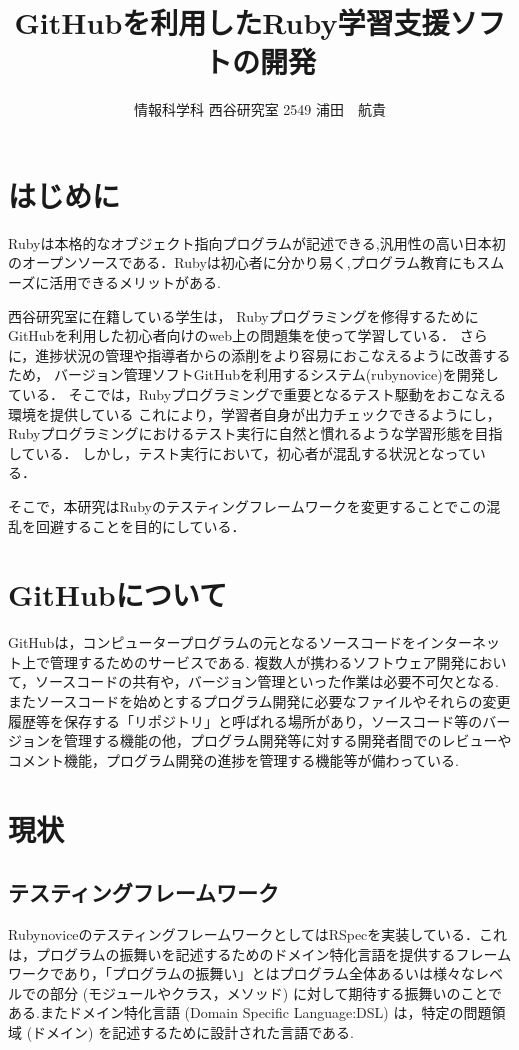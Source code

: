 \documentclass[a4j,twocolumn,uplatex]{jsarticle}
\begin{document}
\title{GitHubを利用したRuby学習支援ソフトの開発}
\author{情報科学科 西谷研究室 2549 浦田　航貴}
\date{}
\maketitle
\section{はじめに}
Rubyは本格的なオブジェクト指向プログラムが記述できる,汎用性の高い日本初のオープンソースである．Rubyは初心者に分かり易く,プログラム教育にもスムーズに活用できるメリットがある.


西谷研究室に在籍している学生は，
Rubyプログラミングを修得するためにGitHubを利用した初心者向けのweb上の問題集を使って学習している．
さらに，進捗状況の管理や指導者からの添削をより容易におこなえるように改善するため，
バージョン管理ソフトGitHubを利用するシステム(rubynovice)を開発している．
そこでは，Rubyプログラミングで重要となるテスト駆動をおこなえる環境を提供している
これにより，学習者自身が出力チェックできるようにし，
Rubyプログラミングにおけるテスト実行に自然と慣れるような学習形態を目指している．
しかし，テスト実行において，初心者が混乱する状況となっている．

そこで，本研究はRubyのテスティングフレームワークを変更することでこの混乱を回避することを目的にしている．

\section{GitHubについて}
GitHubは，コンピュータープログラムの元となるソースコードをインターネット上で管理するためのサービスである.
複数人が携わるソフトウェア開発において，ソースコードの共有や，バージョン管理といった作業は必要不可欠となる.
またソースコードを始めとするプログラム開発に必要なファイルやそれらの変更履歴等を保存する「リポジトリ」と呼ばれる場所があり，ソースコード等のバージョンを管理する機能の他，プログラム開発等に対する開発者間でのレビューやコメント機能，プログラム開発の進捗を管理する機能等が備わっている\cite{1}.

\section{現状}
\subsection{テスティングフレームワーク}
RubynoviceのテスティングフレームワークとしてはRSpecを実装している．これは，プログラムの振舞いを記述するためのドメイン特化言語を提供するフレームワークであり，「プログラムの振舞い」とはプログラム全体あるいは様々なレベルでの部分 (モジュールやクラス，メソッド) に対して期待する振舞いのことである.またドメイン特化言語 (Domain Specific Language:DSL) は，特定の問題領域 (ドメイン) を記述するために設計された言語である\cite{2}.
\end{document}
